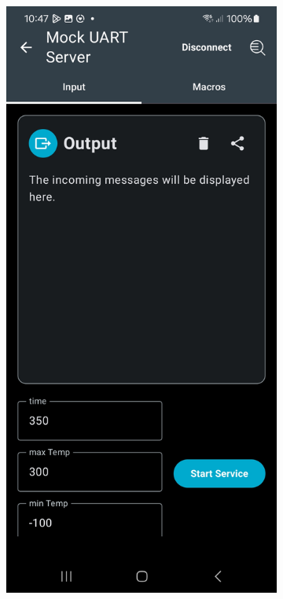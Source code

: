 \begin{figure}[ht!]
\centering
\begin{subfigure}{.4\linewidth}
	\includegraphics[trim={0 4cm 0 3cm},clip,width=\linewidth]{graphics/nRF_toolbox_art_tracking_empty.jpg}

\end{subfigure}
\end{figure}
